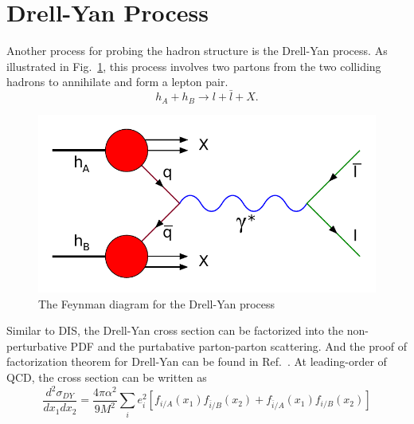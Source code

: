 \section{Drell-Yan Process}
\label{sec:DY}
Another process for probing the hadron structure is the Drell-Yan process\cite{drell1970}.
As illustrated in Fig.\ \ref{fig:DY}, this process involves two partons from the 
two colliding hadrons to annihilate and form a lepton pair.
\begin{equation}
	h_A + h_B \rightarrow l + \bar{l} + X.
\end{equation}
\begin{figure}
	\centering
	\includegraphics[width=0.7\linewidth]{images/Drell-Yan}
    \caption{The Feynman diagram for the Drell-Yan process}
    \label{fig:DY}
\end{figure}
Similar to DIS, the Drell-Yan cross section can be factorized into the non-perturbative
PDF and the purtabative parton-parton scattering. And the proof of factorization 
theorem for Drell-Yan can be found in Ref.\ \cite{collins1989}. At leading-order 
of QCD, the cross section can be written as
\begin{equation}
	\frac{d^2\sigma_{DY}}{dx_{1}dx_{2}} = \frac{4\pi\alpha^2}{9M^2}\sum_i e^2_i
		\left[f_{i/A}\left(x_1\right)f_{\bar{i}/B}\left(x_2\right) +
			f_{\bar{i}/A}\left(x_1\right)f_{i/B}\left(x_2\right)
		\right]
\end{equation}


